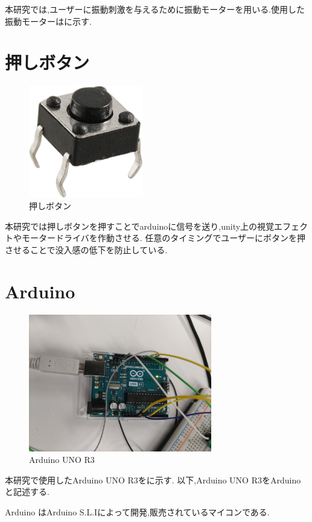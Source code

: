 本研究では,ユーザーに振動刺激を与えるために振動モーターを用いる.使用した振動モーターはに示す.

\section{押しボタン}
\begin{figure}[h]
\centering
\includegraphics[clip,width=5cm]{./fig/push.jpg}
\caption{押しボタン}\label{push}
\end{figure}

本研究では押しボタンを押すことでarduinoに信号を送り,unity上の視覚エフェクトやモータードライバを作動させる.
任意のタイミングでユーザーにボタンを押させることで没入感の低下を防止している.


\section{Arduino}

\begin{figure}[h]
\centering
\includegraphics[clip,width=8cm]{./fig/Arduino.jpg}
\caption{Arduino UNO R3}\label{arduino}
\end{figure}

本研究で使用したArduino UNO R3をに示す.
以下,Arduino UNO R3をArduinoと記述する.

Arduino はArduino S.L.Iによって開発,販売されているマイコンである.

